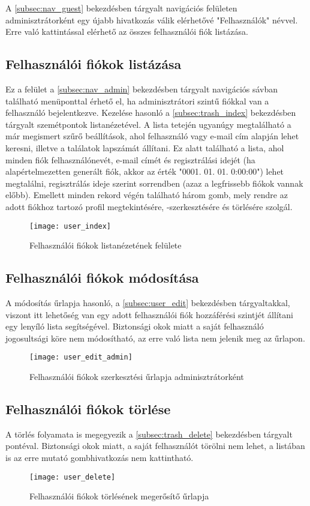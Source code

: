 A \ref{subsec:nav_guest} bekezdésben tárgyalt navigációs felületen adminisztrátorként egy újabb hivatkozás válik elérhetővé "Felhasználók" névvel. Erre való kattintással elérhető az összes felhasználói fiók listázása.

\subsection{Felhasználói fiókok listázása}

Ez a felület a \ref{subsec:nav_admin} bekezdésben tárgyalt navigációs sávban található menüponttal érhető el, ha adminisztrátori szintű fiókkal van a felhasználó bejelentkezve. Kezelése hasonló a \ref{subsec:trash_index} bekezdésben tárgyalt szemétpontok listanézetével. A lista tetején ugyanúgy megtalálható a már megismert szűrő beállítások, ahol felhasználó vagy e-mail cím alapján lehet keresni, illetve a találatok lapszámát állítani. Ez alatt található a lista, ahol minden fiók felhasználónevét, e-mail címét és regisztrálási idejét (ha alapértelmezetten generált fiók, akkor az érték "0001. 01. 01. 0:00:00") lehet megtalálni, regisztrálás ideje szerint sorrendben (azaz a legfrissebb fiókok vannak előbb). Emellett minden rekord végén található három gomb, mely rendre az adott fiókhoz tartozó profil megtekintésére, -szerkesztésére és törlésére szolgál.

\begin{figure}[H]
	\centering
	\texttt{[image: user\_index]}
	\caption{Felhasználói fiókok listanézetének felülete}
	\label{fig:user_index}
\end{figure}

\subsection{Felhasználói fiókok módosítása}

A módosítás űrlapja hasonló, a \ref{subsec:user_edit} bekezdésben tárgyaltakkal, viszont itt lehetőség van egy adott felhasználói fiók hozzáférési szintjét állítani egy lenyíló lista segítségével. Biztonsági okok miatt a saját felhasználó jogosultsági köre nem módosítható, az erre való lista nem jelenik meg az űrlapon.

\begin{figure}[H]
	\centering
	\texttt{[image: user\_edit\_admin]}
	\caption{Felhasználói fiókok szerkesztési űrlapja adminisztrátorként}
	\label{fig:user_edit_admin}
\end{figure}

\subsection{Felhasználói fiókok törlése}

A törlés folyamata is megegyezik a \ref{subsec:trash_delete} bekezdésben tárgyalt pontéval. Biztonsági okok miatt, a saját felhasználót törölni nem lehet, a listában is az erre mutató gombhivatkozás nem kattintható.

\begin{figure}[H]
	\centering
	\texttt{[image: user\_delete]}
	\caption{Felhasználói fiókok törlésének megerősítő űrlapja}
	\label{fig:user_delete}
\end{figure}